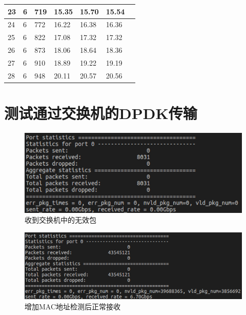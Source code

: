 \documentclass{article}
\begin{document}
\begin{table}[H]
\begin{tabular}{|l|l|l|l|l|l|l|}
		\hline
		23		& 6		& 719	& 15.35	& 15.70	& 15.54 \\
		\hline
		24		& 6		& 772	& 16.22	& 16.38	& 16.36 \\
		\hline
		25		& 6		& 822	& 17.08	& 17.32	& 17.32 \\
		\hline
		26		& 6		& 873	& 18.06	& 18.64	& 18.36 \\
		\hline
		27		& 6		& 910	& 18.89	& 19.22	& 19.19 \\
		\hline
		28		& 6		& 948	& 20.11	& 20.57	& 20.56 \\
		\hline  %
	\end{tabular}
\end{table}

\section{测试通过交换机的DPDK传输}
\begin{figure}[H]
	\centering
	\includegraphics[width = .8\textwidth]{switch_err.png}
	\caption{收到交换机中的无效包}
\end{figure}
\begin{figure}[H]
	\centering
	\includegraphics[width = .8\textwidth]{switch.png}
	\caption{增加MAC地址检测后正常接收}
\end{figure}


\end{document}
